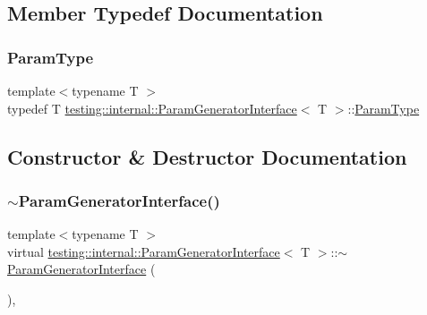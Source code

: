 \subsection{Member Typedef Documentation}
\mbox{\label{classtesting_1_1internal_1_1ParamGeneratorInterface_ab33d2ea424c50beaf503cb125b3cd003}} 
\subsubsection{\texorpdfstring{ParamType}{ParamType}}
{\footnotesize\ttfamily template$<$typename T $>$ \\
typedef T \mbox{\hyperlink{classtesting_1_1internal_1_1ParamGeneratorInterface}{testing\+::internal\+::\+Param\+Generator\+Interface}}$<$ T $>$\+::\mbox{\hyperlink{classtesting_1_1internal_1_1ParamGeneratorInterface_ab33d2ea424c50beaf503cb125b3cd003}{Param\+Type}}}



\subsection{Constructor \& Destructor Documentation}
\mbox{\label{classtesting_1_1internal_1_1ParamGeneratorInterface_ac2767cb9ad2e292e291c4903323c6eff}} 
\subsubsection{\texorpdfstring{$\sim$ParamGeneratorInterface()}{~ParamGeneratorInterface()}}
{\footnotesize\ttfamily template$<$typename T $>$ \\
virtual \mbox{\hyperlink{classtesting_1_1internal_1_1ParamGeneratorInterface}{testing\+::internal\+::\+Param\+Generator\+Interface}}$<$ T $>$\+::$\sim$\mbox{\hyperlink{classtesting_1_1internal_1_1ParamGeneratorInterface}{Param\+Generator\+Interface}} (\begin{DoxyParamCaption}{ }\end{DoxyParamCaption})\hspace{0.3cm}{\ttfamily [inline]}, {\ttfamily [virtual]}}



